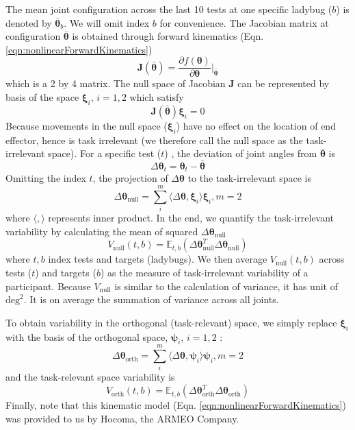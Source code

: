 The mean joint configuration across the last 10 tests at one specific ladybug ($ b $) is denoted by $ \bar{\bm{\theta}}_b $.
We will omit index $ b $ for convenience.
The Jacobian matrix at configuration $ \bar{\bm{\theta}} $ is obtained through forward kinematics (Eqn. \ref{eqn:nonlinearForwardKinematics})
	\begin{equation}
		\bm{J}(\bar{\bm{\theta}}) = \frac{\partial f(\bm{\theta})}{\partial \bm{\theta}} \Big\rvert_{\bar{\bm{\theta}}}
	\end{equation}
which is a 2 by 4 matrix.
The null space of Jacobian $ \bm{J} $ can be represented by basis of the space $ \bm{\xi}_i $, $ i= 1,2 $ which satisfy
	\begin{equation}
	\bm{J}(\bar{\bm{\theta}}) \bm{\xi}_i = 0
	\end{equation}
Because movements in the null space ($ \bm{\xi}_i $) have no effect on the location of end effector, hence is task irrelevant (we therefore call the null space as the task-irrelevant space).
For a specific test ($ t $) , the deviation of joint angles from $ \bar{\bm{\theta}} $ is
	\begin{equation}
	\Delta\bm{\theta}_t = \bm{\theta}_t - \bar{\bm{\theta}}
	\end{equation}
Omitting the index $ t $, the projection of $ \Delta\bm{\theta} $ to the task-irrelevant space is
	\begin{equation}
	\Delta\bm{\theta}_{\text{null}} = \sum_i^m \langle \Delta\bm{\theta}, \bm{\xi}_i \rangle \bm{\xi}_i, m=2
	\end{equation}
where $ \langle,\rangle $ represents inner product.
In the end, we quantify the task-irrelevant variability by calculating the mean of squared $ \Delta\bm{\theta}_{\text{null}} $
	\begin{equation}\label{eqn:nullvar}
	V_{\text{null}}(t,b) = \mathbb{E}_{t,b} (\Delta\bm{\theta}_{\text{null}}^T\Delta\bm{\theta}_{\text{null}})
	\end{equation}
where $ t,b $ index tests and targets (ladybugs). 
We then average $ V_{\text{null}}(t,b) $ across tests ($ t $) and targets ($ b $) as the measure of task-irrelevant variability of a participant. 
Because $ V_{\text{null}} $ is similar to the calculation of variance, it has unit of $ \text{deg}^2 $.
It is on average the summation of variance across all joints.

To obtain variability in the orthogonal (task-relevant) space, we simply replace $ \bm{\xi}_i $ with the basis of the orthogonal space, $ \bm{\psi}_i $, $ i= 1,2 $  :
	\begin{equation}
	\Delta\bm{\theta}_{\text{orth}} = \sum_i^m \langle \Delta\bm{\theta}, \bm{\psi}_i \rangle \bm{\psi}_i, m=2
	\end{equation}
and the task-relevant space variability is
	\begin{equation}\label{eqn:taskvar}
	V_{\text{orth}}(t,b) = \mathbb{E}_{t,b} (\Delta\bm{\theta}_{\text{orth}}^T\Delta\bm{\theta}_{\text{orth}})
	\end{equation}
Finally, note that this kinematic model (Eqn. \ref{eqn:nonlinearForwardKinematics}) was provided to us by Hocoma, the ARMEO Company. 

